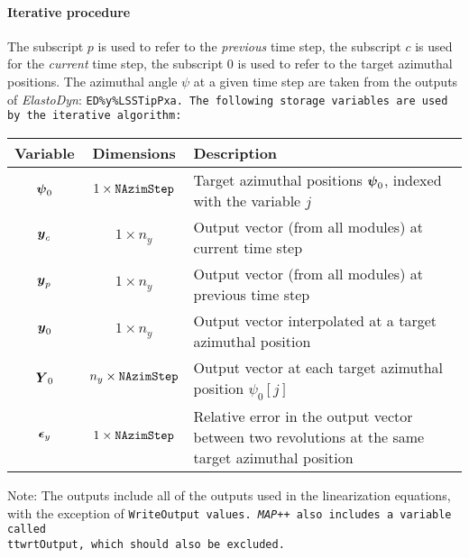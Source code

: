 \documentclass[11pt]{article}
\begin{document}
\paragraph{Iterative procedure}
The subscript $p$ is used to refer to the \textit{previous} time step, the subscript $c$ is used for the \textit{current} time step, the subscript $0$ is used to refer to the target azimuthal positions.
% 
The azimuthal angle $\psi$ 
at a given time step are taken from the outputs of \textit{ElastoDyn}: \tt{ED\%y\%LSSTipPxa}.
% 
% 
% 
The following storage variables are used by the iterative algorithm:
\begin{table}[!h]\centering
\begin{tabular}{ccp{10cm}}
\textbf{Variable} & \textbf{Dimensions}& \textbf{Description}\\
\hline
$\v{\psi}_0$ & $1\times \tt{NAzimStep}$ & Target azimuthal positions $\v{\psi}_0$, indexed with the variable $j$ \\
$\v{y}_c$ & $1\times n_y$ & Output vector (from all modules) at current time step \\
$\v{y}_p$ & $1\times n_y$ & Output vector (from all modules) at previous time step \\
$\v{y}_0$ & $1\times n_y$ & Output vector interpolated at a target azimuthal position \\
$\m{Y}_0$ & $n_{y}\times \tt{NAzimStep}$ & Output vector at each target azimuthal position $\psi_0[j]$ \\
$\v{\epsilon}_y$ & $1 \times \tt{NAzimStep}$ & Relative error in the output vector between two revolutions at the same target azimuthal position \\
\hline
\end{tabular}
\end{table}

Note: The outputs include all of the outputs used in the linearization equations, with the exception of \tt{WriteOutput} values.
\textit{MAP++} also includes a variable called \\tt{wrtOutput}, which should also be excluded.
\end{document}
